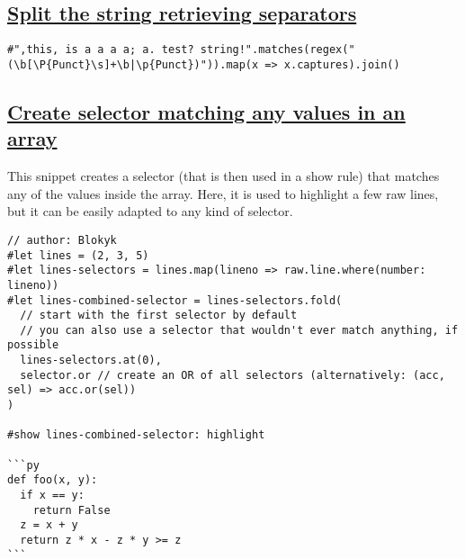 \pandocbounded{}

\subsection{\texorpdfstring{\hyperref[split-the-string-retrieving-separators]{Split
the string retrieving
separators}}{Split the string retrieving separators}}\label{split-the-string-retrieving-separators}

\begin{verbatim}
#",this, is a a a a; a. test? string!".matches(regex("(\b[\P{Punct}\s]+\b|\p{Punct})")).map(x => x.captures).join()
\end{verbatim}

\pandocbounded{}

\subsection{\texorpdfstring{\hyperref[create-selector-matching-any-values-in-an-array]{Create
selector matching any values in an
array}}{Create selector matching any values in an array}}\label{create-selector-matching-any-values-in-an-array}

This snippet creates a selector (that is then used in a show rule) that
matches any of the values inside the array. Here, it is used to
highlight a few raw lines, but it can be easily adapted to any kind of
selector.

\begin{verbatim}
// author: Blokyk
#let lines = (2, 3, 5)
#let lines-selectors = lines.map(lineno => raw.line.where(number: lineno))
#let lines-combined-selector = lines-selectors.fold(
  // start with the first selector by default
  // you can also use a selector that wouldn't ever match anything, if possible
  lines-selectors.at(0),
  selector.or // create an OR of all selectors (alternatively: (acc, sel) => acc.or(sel))
)

#show lines-combined-selector: highlight

```py
def foo(x, y):
  if x == y:
    return False
  z = x + y
  return z * x - z * y >= z
```
\end{verbatim}

\pandocbounded{}

